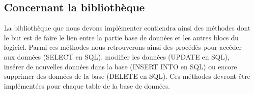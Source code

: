 \subsection{Concernant la bibliothèque}

La bibliothèque que nous devons implémenter contiendra ainsi des méthodes dont le but est de faire le lien entre la partie base de données et les autres blocs du logiciel. Parmi ces méthodes nous retrouverons ainsi des procédés pour accéder aux données (SELECT en SQL), modifier les données (UPDATE en SQL), insérer de nouvelles données dans la base (INSERT INTO en SQL) ou encore supprimer des données de la base (DELETE en SQL). Ces méthodes devront être implémentées pour chaque table de la base de données.








